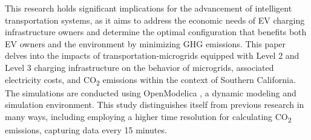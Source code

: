 \documentclass[conference]{IEEEtran}
\begin{document}
		This research holds significant implications for the advancement of intelligent transportation systems, as it aims to address the economic needs of EV charging infrastructure owners and determine the optimal configuration that benefits both EV owners and the environment by minimizing GHG emissions. This paper delves into the impacts of transportation-microgrids equipped with Level 2 and Level 3 charging infrastructure on the behavior of microgrids, associated electricity costs, and CO\textsubscript{2} emissions within the context of Southern California. The simulations are conducted using OpenModelica \cite{ModelicaLanguage}, a dynamic modeling and simulation environment. This study distinguishes itself from previous research in many ways, including employing a higher time resolution for calculating CO\textsubscript{2} emissions, capturing data every 15 minutes.
\end{document}
